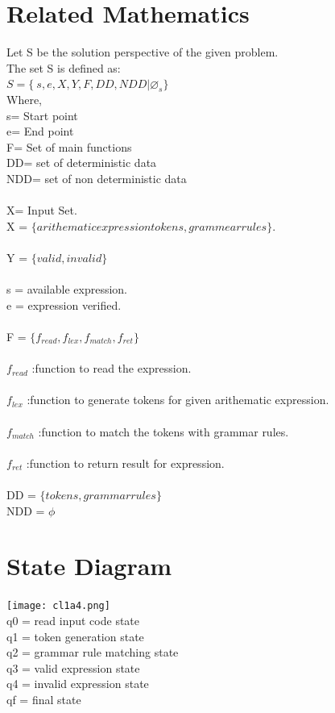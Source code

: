 \documentclass[10pt,a4paper]{article}
\begin{document}
\section{Related Mathematics}
Let S be the solution perspective of the given problem.
\\The set S is defined as:
\\$S=\lbrace\ s,e,X,Y,F,DD,NDD|\varnothing_{s}\rbrace$
\\Where,
\\s= Start point 
\\e= End point 
\\F= Set of main functions
\\DD= set of deterministic data
\\NDD= set of non deterministic data
\\\\X= Input Set.
\\X = $\lbrace arithematic expression tokens, grammear rules \rbrace$.
\\\\ Y = $\lbrace valid, invalid \rbrace$ 
\\\\ s = available expression.
\\ e = expression verified.
\\\\ F = $\lbrace f_{read}, f_{lex}, f_{match}, f_{ret} \rbrace$
\\\\$f_{read}$  :function to read the expression.
\\\\$f_{lex}$ :function to generate tokens for given arithematic expression.
\\\\ $f_{match}$ :function to match the tokens with grammar rules.
\\\\ $f_{ret}$ :function to return result for expression.
\\\\ DD = $\lbrace tokens, grammar rules \rbrace$
\\ NDD = $\phi$


\section{State Diagram}
\texttt{[image: cl1a4.png]}
\\q0 = read input code state
\\q1 = token generation state
\\q2 = grammar rule matching state
\\q3 = valid expression state
\\q4 = invalid expression state
\\qf = final state
\end{document}
